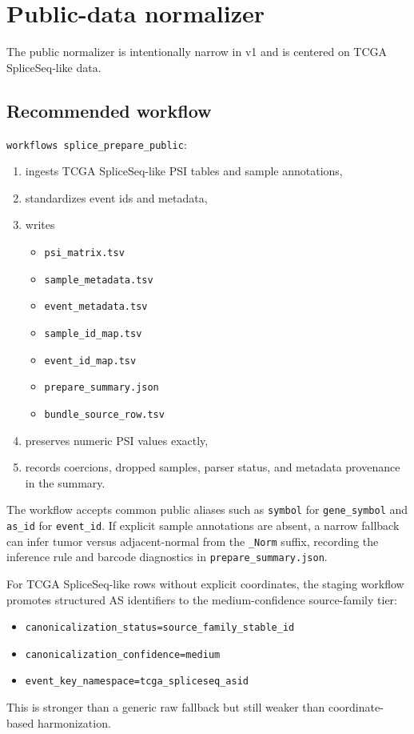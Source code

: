 \documentclass[11pt]{article}
\begin{document}
\section{Public-data normalizer}
The public normalizer is intentionally narrow in v1 and is centered on TCGA SpliceSeq-like data.

\subsection{Recommended workflow}
\texttt{workflows splice\_prepare\_public}:
\begin{enumerate}[leftmargin=2em]
\item ingests TCGA SpliceSeq-like PSI tables and sample annotations,
\item standardizes event ids and metadata,
\item writes
  \begin{itemize}
  \item \texttt{psi\_matrix.tsv}
  \item \texttt{sample\_metadata.tsv}
  \item \texttt{event\_metadata.tsv}
  \item \texttt{sample\_id\_map.tsv}
  \item \texttt{event\_id\_map.tsv}
  \item \texttt{prepare\_summary.json}
  \item \texttt{bundle\_source\_row.tsv}
  \end{itemize}
\item preserves numeric PSI values exactly,
\item records coercions, dropped samples, parser status, and metadata provenance in the summary.
\end{enumerate}

The workflow accepts common public aliases such as \texttt{symbol} for \texttt{gene\_symbol} and \texttt{as\_id} for \texttt{event\_id}. If explicit sample annotations are absent, a narrow fallback can infer tumor versus adjacent-normal from the \texttt{\_Norm} suffix, recording the inference rule and barcode diagnostics in \texttt{prepare\_summary.json}.

For TCGA SpliceSeq-like rows without explicit coordinates, the staging workflow promotes structured AS identifiers to the medium-confidence source-family tier:
\begin{itemize}[leftmargin=2em]
\item \texttt{canonicalization\_status=source\_family\_stable\_id}
\item \texttt{canonicalization\_confidence=medium}
\item \texttt{event\_key\_namespace=tcga\_spliceseq\_asid}
\end{itemize}
This is stronger than a generic raw fallback but still weaker than coordinate-based harmonization.
\end{document}
